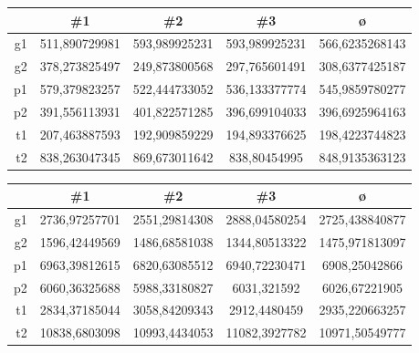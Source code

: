 \begin{center}
    \begin{tabular}{|r|S[table-format=3.9]|S[table-format=3.9]|S[table-format=3.9]|S[table-format=3.10]|}
        \hline
         & {\#1} & {\#2} & {\#3} & ø \\\hline
        g1 & 511,890729981 & 593,989925231 & 593,989925231 & 566,6235268143 \\\hline
        g2 & 378,273825497 & 249,873800568 & 297,765601491 & 308,6377425187 \\\hline
        p1 & 579,379823257 & 522,444733052 & 536,133377774 & 545,9859780277 \\\hline
        p2 & 391,556113931 & 401,822571285 & 396,699104033 & 396,6925964163 \\\hline
        t1 & 207,463887593 & 192,909859229 & 194,893376625 & 198,4223744823 \\\hline
        t2 & 838,263047345 & 869,673011642 & 838,80454995  & 848,9135363123 \\\hline
    \end{tabular}
\end{center}

\begin{center}
    \begin{tabular}{|r|S[table-format=5.8]|S[table-format=5.8]|S[table-format=5.8]|S[table-format=5.9]|}
        \hline
         & {\#1} & {\#2} & {\#3} & ø \\\hline
        g1 & 2736,97257701 & 2551,29814308 & 2888,04580254 & 2725,438840877  \\\hline
        g2 & 1596,42449569 & 1486,68581038 & 1344,80513322 & 1475,971813097  \\\hline
        p1 & 6963,39812615 & 6820,63085512 & 6940,72230471 & 6908,25042866   \\\hline
        p2 & 6060,36325688 & 5988,33180827 & 6031,321592   & 6026,67221905   \\\hline
        t1 & 2834,37185044 & 3058,84209343 & 2912,4480459  & 2935,220663257  \\\hline
        t2 & 10838,6803098 & 10993,4434053 & 11082,3927782 & 10971,50549777  \\\hline
    \end{tabular}
\end{center}

